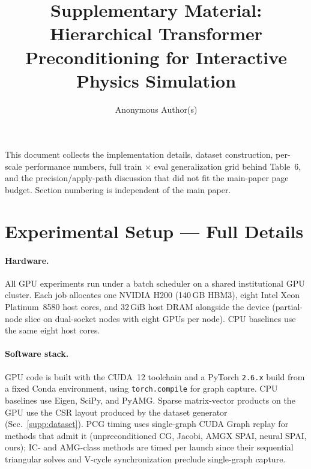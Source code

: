 \documentclass[acmtog,anonymous,review]{acmart}
\begin{document}
\title{Supplementary Material: Hierarchical Transformer Preconditioning for Interactive Physics Simulation}

\author{Anonymous Author(s)}
\renewcommand{\shortauthors}{Anonymous Author(s)}

\maketitle

This document collects the implementation details, dataset construction,
per-scale performance numbers, full train$\,\times\,$eval generalization grid
behind Table~6, and the precision/apply-path discussion that did not fit the
main-paper page budget. Section numbering is independent of the main paper.

\section{Experimental Setup --- Full Details}
\label{supp:experimental-setup}

\paragraph{Hardware.}
All GPU experiments run under a batch scheduler on a shared institutional GPU
cluster. Each job allocates one NVIDIA H200 (140\,GB HBM3), eight Intel Xeon
Platinum~8580 host cores, and 32\,GiB host DRAM alongside the device (partial-node
slice on dual-socket nodes with eight GPUs per node). CPU baselines use the same
eight host cores.

\paragraph{Software stack.}
GPU code is built with the CUDA~12 toolchain and a PyTorch \texttt{2.6.x} build
from a fixed Conda environment, using \verb|torch.compile| for graph capture. CPU
baselines use Eigen, SciPy, and PyAMG. Sparse matrix-vector products on the GPU use
the CSR layout produced by the dataset generator (Sec.~\ref{supp:dataset}). PCG
timing uses single-graph CUDA Graph replay for methods that admit it
(unpreconditioned CG, Jacobi, AMGX SPAI, neural SPAI, ours); IC- and AMG-class methods
are timed per launch since their sequential triangular solves and V-cycle synchronization
preclude single-graph capture.
\end{document}
